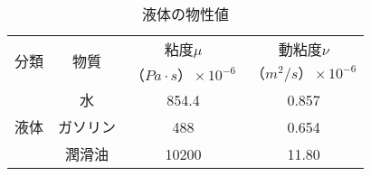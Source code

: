 \documentclass{jarticle}
\begin{document}
\begin{table}[h]
   
    \centering
    \caption{液体の物性値}
    \label{tab:hogehoge}
    \begin {tabular}{c|c|c|c}
        \hline
         \multirow{2}{*}{分類}   &  \multirow{2}{*}{物質} &  粘度$\mu$   & 動粘度$\nu$ \\ \cline{3-4}
         & & $（Pa \cdot s）\times 10^{-6}$ & $（m^2/s）\times 10^{-6} $\\ \hline \hline 
         \multirow{3}{*}{液体}   &  水 & 854.4 & 0.857 \\ \cline{2-4}
         & ガソリン & 488 & 0.654\\ \cline{2-4}
         &潤滑油 & 10200 & 11.80 \\ \hline 
         
    \end{tabular}
    
\end{table}
\end{document}

